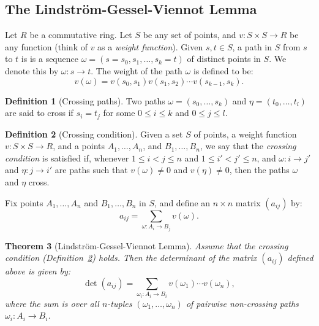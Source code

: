 \documentclass[11pt]{amsproc}
\newtheorem{theorem}{Theorem}[subsection]
\theoremstyle{definition}
\newtheorem{definition}[theorem]{Definition}
\theoremstyle{example}
\begin{document}
\subsection{The Lindstr\"om-Gessel-Viennot Lemma}
\label{sec:lgv}
Let $R$ be a commutative ring.
Let $S$ be any set of points, and $v:S\times S\to R$ be any function (think of $v$ as a \emph{weight function}).
Given $s, t\in S$, a path in $S$ from $s$ to $t$ is is a sequence $\omega=(s=s_0,s_1,\dotsc,s_k=t)$ of distinct points in $S$.
We denote this by $\omega:s\to t$.
The weight of the path $\omega$ is defined to be:
\begin{displaymath}
  v(\omega) = v(s_0,s_1)v(s_1,s_2)\dotsb v(s_{k-1}, s_k).
\end{displaymath}
\begin{definition}
  [Crossing paths]
  Two paths $\omega=(s_0,\dotsc, s_k)$ and $\eta=(t_0,\dotsc,t_l)$ are said to cross if $s_i= t_j$ for some $0\leq i \leq k$ and $0\leq j \leq l$.
\end{definition}
\begin{definition}
  [Crossing condition]
  \label{definition:crossing-condition}
  Given a set $S$ of points, a weight function $v:S\times S\to R$, and a points $A_1,\dotsc,A_n$, and $B_1,\dotsc, B_n$, we say that the \emph{crossing condition} is satisfied if, whenever $1\leq i<j\leq n$ and $1\leq i'<j'\leq n$, and $\omega:i \to j'$ and $\eta: j\to i'$ are paths such that $v(\omega)\neq 0$ and $v(\eta)\neq 0$, then the paths $\omega$ and $\eta$ cross.
\end{definition}
Fix points $A_1,\dotsc, A_n$ and $B_1,\dotsc, B_n$ in $S$, and define an $n\times n$ matrix $(a_{ij})$ by:
\begin{displaymath}
  a_{ij} = \sum_{\omega:A_i\to B_j} v(\omega).
\end{displaymath}
\begin{theorem}
  [Lindstr\"om-Gessel-Viennot Lemma]
  \label{lemma:lgv}
  Assume that the crossing condition (Definition~\ref{definition:crossing-condition}) holds.
  Then the determinant of the matrix $(a_{ij})$ defined above is given by:
  \begin{equation}
    \label{eq:lgv}
    \det(a_{ij}) = \sum_{\omega_i:A_i\to B_i} v(\omega_1)\dotsb v(\omega_n),
  \end{equation}
  where the sum is over all $n$-tuples $(\omega_1,\dotsc, \omega_n)$ of pairwise non-crossing paths $\omega_i:A_i\to B_i$.
\end{theorem}
\end{document}
